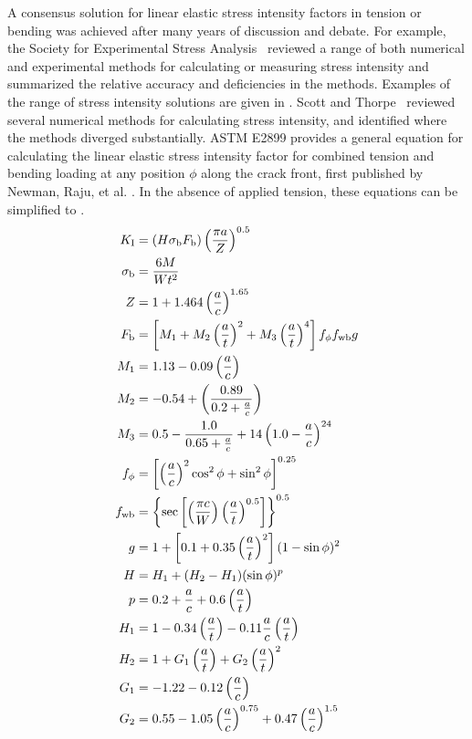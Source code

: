 A consensus solution for linear elastic stress intensity factors in tension or bending was achieved after many years of discussion and debate.
For example, the Society for Experimental Stress Analysis~\cite{sesa1980} reviewed a range of both numerical and experimental methods for calculating or measuring stress intensity and summarized the relative accuracy and deficiencies in the methods.
Examples of the range of stress intensity solutions are given in .
Scott and Thorpe~\cite{scottthorpe1981} reviewed several numerical methods for calculating stress intensity, and identified where the methods diverged substantially.
ASTM E2899 provides a general equation for calculating the linear elastic stress intensity factor \KI for combined tension and bending loading at any position \(\phi\) along the crack front, first published by Newman, Raju, et al. \cite{newmanraju1983a,newmanreuter2000}.
In the absence of applied tension, these equations can be simplified to .
\begingroup
\allowdisplaybreaks
\begin{align}
K_\textnormal{I} &= (
        H \sigma_\text{b} F_\text{b}
        ) \left(\frac{\pi a}{Z}\right)^{0.5} \label{eq:e2899-ki} \\
\sigma_\text{b} &= \frac{6 M}{W t^2} \\
Z &= 1 + 1.464\left(\frac{a}{c}\right)^{1.65} \\
F_\text{b} &= \left[ M_1 + M_2 \left( \frac{a}{t} \right)^2 + M_3 \left( \frac{a}{t} \right)^4 \right] f_\phi f_\text{wb} g \\
M_1 &= 1.13 - 0.09 \left( \frac{a}{c} \right) \\
M_2 &= -0.54 + \left( \frac{0.89}{0.2 + \frac{a}{c}} \right) \\
M_3 &= 0.5 - \frac{1.0}{0.65+\frac{a}{c}} + 14\left( 1.0 - \frac{a}{c} \right)^{24} \\
f_\phi &= \left[ \left( \frac{a}{c} \right)^2 \cos^2 \phi + \sin^2 \phi \right]^{0.25} \\
f_\text{wb} &= \left\{ \sec \left[ \left( \frac{\pi c}{W} \right) \left( \frac{a}{t} \right)^{0.5} \right] \right\}^{0.5} \\
g &= 1+ \left[ 0.1 + 0.35 \left( \frac{a}{t} \right)^2 \right] (1 - \sin \phi)^2 \\
H &= H_1 + (H_2 - H_1) (\sin \phi)^p \\
p &= 0.2 + \frac{a}{c} + 0.6 \left( \frac{a}{t} \right) \\
H_1 &= 1 - 0.34 \left( \frac{a}{t} \right) - 0.11 \frac{a}{c} \left( \frac{a}{t} \right) \\
H_2 &= 1 + G_1 \left( \frac{a}{t} \right) + G_2 \left( \frac{a}{t} \right)^2 \\
G_1 &= -1.22 - 0.12 \left( \frac{a}{c} \right) \\
G_2 &= 0.55 - 1.05 \left( \frac{a}{c} \right)^{0.75} + 0.47 \left( \frac{a}{c} \right)^{1.5} \label{eq:e2899-g2}
\end{align}
